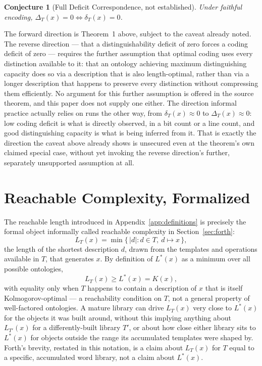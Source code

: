 \documentclass[11pt]{article}
\theoremstyle{plain}
\newtheorem{conjecture}{Conjecture}
\begin{document}
\begin{conjecture}[Full Deficit Correspondence, not established]
Under faithful encoding, $\Delta_T(x) = 0 \iff \delta_T(x) = 0$.
\end{conjecture}

The forward direction is Theorem~1 above, subject to the caveat already noted. The reverse direction --- that a distinguishability deficit of zero forces a coding deficit of zero --- requires the further assumption that optimal coding uses every distinction available to it: that an ontology achieving maximum distinguishing capacity does so via a description that is also length-optimal, rather than via a longer description that happens to preserve every distinction without compressing them efficiently. No argument for this further assumption is offered in the source theorem, and this paper does not supply one either. The direction informal practice actually relies on runs the other way, from $\delta_T(x) \approx 0$ to $\Delta_T(x) \approx 0$: low coding deficit is what is directly observed, in a bit count or a line count, and good distinguishing capacity is what is being inferred from it. That is exactly the direction the caveat above already shows is unsecured even at the theorem's own claimed special case, without yet invoking the reverse direction's further, separately unsupported assumption at all.

\section{Reachable Complexity, Formalized}
\label{app:reachable}

The reachable length introduced in Appendix~\ref{app:definitions} is precisely the formal object informally called reachable complexity in Section~\ref{sec:forth}:
\[
L_T(x) = \min\{\,|d| : d \in T,\ d \mapsto x\,\},
\]
the length of the shortest description $d$, drawn from the templates and operations available in $T$, that generates $x$. By definition of $L^*(x)$ as a minimum over all possible ontologies,
\[
L_T(x) \ge L^*(x) = K(x),
\]
with equality only when $T$ happens to contain a description of $x$ that is itself Kolmogorov-optimal --- a reachability condition on $T$, not a general property of well-factored ontologies. A mature library can drive $L_T(x)$ very close to $L^*(x)$ for the objects it was built around, without this implying anything about $L_{T'}(x)$ for a differently-built library $T'$, or about how close either library sits to $L^*(x)$ for objects outside the range its accumulated templates were shaped by. Forth's brevity, restated in this notation, is a claim about $L_T(x)$ for $T$ equal to a specific, accumulated word library, not a claim about $L^*(x)$.
\end{document}
